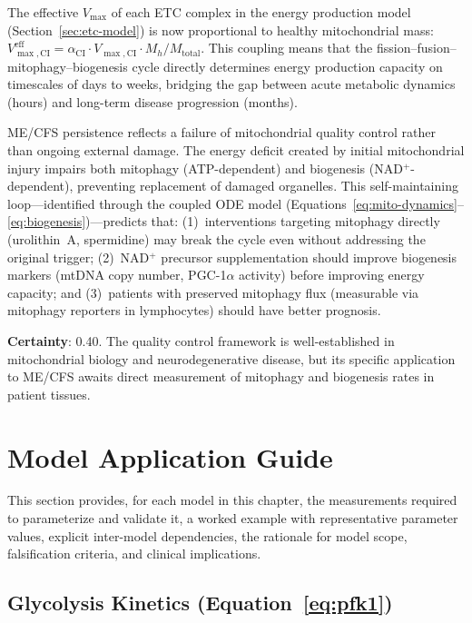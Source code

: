 The effective $V_{\max}$ of each ETC complex in the energy production model (Section~\ref{sec:etc-model}) is now proportional to healthy mitochondrial mass: $V_{\max,\text{CI}}^{\text{eff}} = \alpha_{\text{CI}} \cdot V_{\max,\text{CI}} \cdot M_h / M_{\text{total}}$. This coupling means that the fission--fusion--mitophagy--biogenesis cycle directly determines energy production capacity on timescales of days to weeks, bridging the gap between acute metabolic dynamics (hours) and long-term disease progression (months).

\begin{hypothesis}
ME/CFS persistence reflects a failure of mitochondrial quality control rather than ongoing external damage. The energy deficit created by initial mitochondrial injury impairs both mitophagy (ATP-dependent) and biogenesis (NAD$^+$-dependent), preventing replacement of damaged organelles. This self-maintaining loop---identified through the coupled ODE model (Equations~\ref{eq:mito-dynamics}--\ref{eq:biogenesis})---predicts that: (1)~interventions targeting mitophagy directly (urolithin~A, spermidine) may break the cycle even without addressing the original trigger; (2)~NAD$^+$ precursor supplementation should improve biogenesis markers (mtDNA copy number, PGC-1$\alpha$ activity) before improving energy capacity; and (3)~patients with preserved mitophagy flux (measurable via mitophagy reporters in lymphocytes) should have better prognosis.

\textbf{Certainty}: 0.40. The quality control framework is well-established in mitochondrial biology and neurodegenerative disease, but its specific application to ME/CFS awaits direct measurement of mitophagy and biogenesis rates in patient tissues.
\end{hypothesis}

\section{Model Application Guide}
\label{sec:energy-model-application}

This section provides, for each model in this chapter, the measurements required to parameterize and validate it, a worked example with representative parameter values, explicit inter-model dependencies, the rationale for model scope, falsification criteria, and clinical implications.

\subsection{Glycolysis Kinetics (Equation~\ref{eq:pfk1})}

